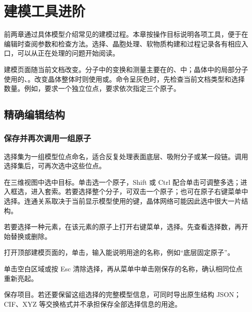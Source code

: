 \chapter{建模工具进阶}\label{ch:modeling-tools}\label{sec:modeling-reference}

前两章通过具体模型介绍常见的建模过程。本章按操作目标说明各项工具，便于在编辑时查阅参数和检查方法。选择、晶胞处理、软物质构建和过程记录各有相应入口，可以从正在处理的问题开始阅读。

建模页面随当前文档改变。分子中的变换和测量主要在的、中；晶体中的局部分子使用的、。改变晶体整体时则使用或。命令呈灰色时，先检查当前文档类型和选择数量。例如，要求一个独立位点，要求依次指定三个原子。

\section{精确编辑结构}

\subsection{保存并再次调用一组原子}\label{sec:selection-set-workflow}

选择集为一组模型位点命名，适合反复处理表面底层、吸附分子或某一段链。调用选择集后，可再次选中这些位点。

\begin{steps}
  \item 在三维视图中选中目标。单击选一个原子，Shift 或 Ctrl 配合单击可调整多选；进入框选，进入套索。若要选择整个分子，可双击一个原子；也可在原子右键菜单中选择。连通关系取决于当前显示模型使用的键，晶体网络可能因此选中很大一片结构。
  \item 若要选择一种元素，在该元素的原子上打开右键菜单，选择。先查看选择数，再开始替换或删除。
  \item 打开顶部建模页面的，单击，输入能说明用途的名称，例如“底层固定原子”。
  \item 单击空白区域或按 Esc 清除选择，再从菜单中单击刚保存的名称，确认相同位点重新亮起。
  \item 保存项目。若还要保留这组选择的完整模型信息，可同时导出原生结构 JSON；CIF、XYZ 等交换格式并不承担保存全部选择信息的用途。
\end{steps}


